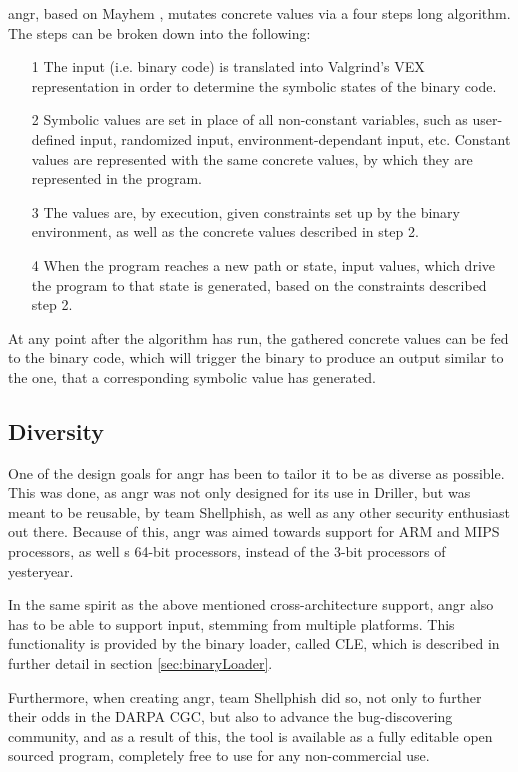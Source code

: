 \documentclass[a4paper]{article}
\begin{document}
angr, based on Mayhem \cite{Mayhem}, mutates concrete values via a four steps long algorithm. The steps can be broken down into the following:
\begin{itemize}
	\item[1] The input (i.e. binary code) is translated into Valgrind's VEX \cite{VEX} representation in order to determine the symbolic states of the binary code.
	\item[2] Symbolic values are set in place of all non-constant variables, such as user-defined input, randomized input, environment-dependant input, etc. Constant values are represented with the same concrete values, by which they are represented in the program.
	\item[3] The values are, by execution, given constraints set up by the binary environment, as well as the concrete values described in step 2.
	\item[4] When the program reaches a new path or state, input values, which drive the program to that state is generated, based on the constraints described step 2.
\end{itemize}
At any point after the algorithm has run, the gathered concrete values can be fed to the binary code, which will trigger the binary to produce an output similar to the one, that a corresponding symbolic value has generated.
\subsection{Diversity}
\label{sec:Diversityangr}
One of the design goals for angr has been to tailor it to be as diverse as possible. This was done, as angr was not only designed for its use in Driller, but was meant to be reusable, by team Shellphish, as well as any other security enthusiast out there. Because of this, angr was aimed towards support for ARM and MIPS processors, as well s 64-bit processors, instead of the 3-bit processors of yesteryear.

In the same spirit as the above mentioned cross-architecture support, angr also has to be able to support input, stemming from multiple platforms. This functionality is provided by the binary loader, called CLE, which is described in further detail in section \ref{sec:binaryLoader}.

Furthermore, when creating angr, team Shellphish did so, not only to further their odds in the DARPA CGC, but also to advance the bug-discovering community, and as a result of this, the tool is available as a fully editable open sourced program, completely free to use for any non-commercial use.
\end{document}
